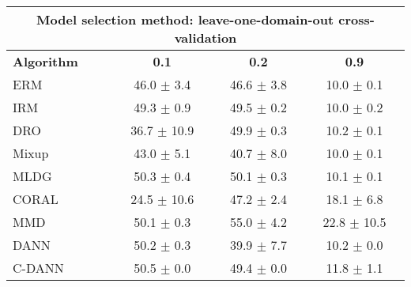 \documentclass{article}
\begin{document}
\begin{center}
\begin{tabular}{lccc}
\toprule
\multicolumn{4}{c}{\textbf{Model selection method: leave-one-domain-out cross-validation}} \\
\midrule
\textbf{Algorithm}    & \textbf{0.1}              & \textbf{0.2}              & \textbf{0.9}              \\
\midrule
ERM                       & 46.0 $\pm$ 3.4            & 46.6 $\pm$ 3.8            & 10.0 $\pm$ 0.1            \\
IRM                       & 49.3 $\pm$ 0.9            & 49.5 $\pm$ 0.2            & 10.0 $\pm$ 0.2            \\
DRO                 & 36.7 $\pm$ 10.9           & 49.9 $\pm$ 0.3            & 10.2 $\pm$ 0.1            \\
Mixup                     & 43.0 $\pm$ 5.1            & 40.7 $\pm$ 8.0            & 10.0 $\pm$ 0.1            \\
MLDG                      & 50.3 $\pm$ 0.4            & 50.1 $\pm$ 0.3            & 10.1 $\pm$ 0.1            \\
CORAL                     & 24.5 $\pm$ 10.6           & 47.2 $\pm$ 2.4            & 18.1 $\pm$ 6.8            \\
MMD                       & 50.1 $\pm$ 0.3            & 55.0 $\pm$ 4.2            & 22.8 $\pm$ 10.5           \\
DANN                       & 50.2 $\pm$ 0.3            & 39.9 $\pm$ 7.7            & 10.2 $\pm$ 0.0            \\
C-DANN                   & 50.5 $\pm$ 0.0            & 49.4 $\pm$ 0.0            & 11.8 $\pm$ 1.1            \\
\bottomrule
\end{tabular}
\end{center}
\end{document}
